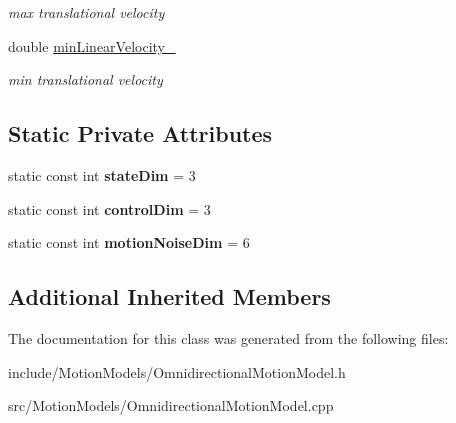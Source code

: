 \begin{DoxyCompactItemize}
\begin{DoxyCompactList}\small\item\em max translational velocity \end{DoxyCompactList}\item 
\hypertarget{class_omnidirectional_motion_model_ad218f1003f574123d4b1e96824b224b6}{double \hyperlink{class_omnidirectional_motion_model_ad218f1003f574123d4b1e96824b224b6}{min\-Linear\-Velocity\-\_\-}}\label{class_omnidirectional_motion_model_ad218f1003f574123d4b1e96824b224b6}

\begin{DoxyCompactList}\small\item\em min translational velocity \end{DoxyCompactList}\end{DoxyCompactItemize}
\subsection*{Static Private Attributes}
\begin{DoxyCompactItemize}
\item 
\hypertarget{class_omnidirectional_motion_model_aa17cea88fc55be6af82f90ac354aa1ec}{static const int {\bfseries state\-Dim} = 3}\label{class_omnidirectional_motion_model_aa17cea88fc55be6af82f90ac354aa1ec}

\item 
\hypertarget{class_omnidirectional_motion_model_a0862e6da597729da2ff6280ad07b82e2}{static const int {\bfseries control\-Dim} = 3}\label{class_omnidirectional_motion_model_a0862e6da597729da2ff6280ad07b82e2}

\item 
\hypertarget{class_omnidirectional_motion_model_ace335426ed76e192a387934debaaffac}{static const int {\bfseries motion\-Noise\-Dim} = 6}\label{class_omnidirectional_motion_model_ace335426ed76e192a387934debaaffac}

\end{DoxyCompactItemize}
\subsection*{Additional Inherited Members}


The documentation for this class was generated from the following files\-:\begin{DoxyCompactItemize}
\item 
include/\-Motion\-Models/Omnidirectional\-Motion\-Model.\-h\item 
src/\-Motion\-Models/Omnidirectional\-Motion\-Model.\-cpp\end{DoxyCompactItemize}
